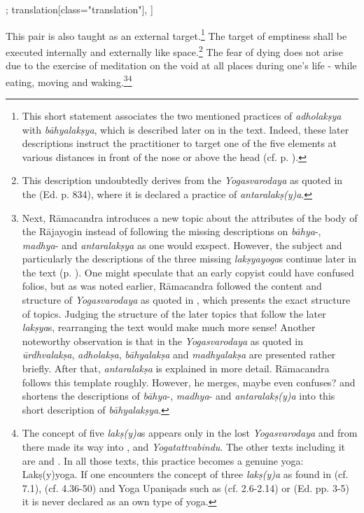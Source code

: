 \begin{alignment}[
  texts=edition[class="edition"];
  translation[class="translation"],
  ]
\begin{translation}
\begin{tlate}
    This pair is also taught as an external target.\footnote{This short statement associates the two mentioned practices of \textit{adholakṣya} with \textit{bāhyalakṣya}, which is described later on in the text. Indeed, these later descriptions instruct the practitioner to target one of the five elements at various distances in front of the nose or above the head (cf. p. \pageref{bahya2}).} The target of emptiness shall be executed internally and externally like space.\footnote{This description undoubtedly derives from the \textit{Yogasvarodaya} as quoted in the  (Ed. p. 834), where it is declared a practice of \textit{antaralakṣ(y)a}.} The fear of dying does not arise due to the exercise of meditation on the void at all places during one's life - while eating, moving and waking.\footnote{Next, Rāmacandra introduces a new topic about the attributes of the body of the Rājayogin instead of following the missing descriptions on \textit{bāhya}-, \textit{madhya}- and \textit{antaralakṣya} as one would exspect. However, the subject and particularly the descriptions of the three missing \textit{lakṣyayoga}s continue later in the text (p. \pageref{bahya2}). One might speculate that an early copyist could have confused folios, but as was noted earlier, Rāmacandra followed the content and structure of \textit{Yogasvarodaya} as quoted in , which presents the exact structure of topics. Judging the structure of the later topics that follow the later \textit{lakṣya}s, rearranging the text would make much more sense! Another noteworthy observation is that in the \textit{Yogasvarodaya} as quoted in  \textit{ūrdhvalakṣa}, \textit{adholakṣa}, \textit{bāhyalakṣa} and \textit{madhyalakṣa} are presented rather briefly. After that, \textit{antaralakṣa} is explained in more detail. Rāmacandra follows this template roughly. However, he merges, maybe even confuses? and shortens the descriptions of \textit{bāhya}-, \textit{madhya}- and \textit{antaralakṣ(y)a} into this short description of \textit{bāhyalakṣya}.}\footnote{The concept of five \textit{lakṣ(y)a}s appears only in the lost \textit{Yogasvarodaya} and from there made its way into ,  and \textit{Yogatattvabindu}. The other texts including it are  and . In all those texts, this practice becomes a genuine yoga: Lakṣ(y)yoga. If one encounters the concept of three \textit{lakṣ(y)a} as found in  (cf. 7.1),  (cf. 4.36-50) and Yoga Upaniṣads such as (cf. 2.6-2.14) or  (Ed. pp. 3-5) it is never declared as an own type of yoga.} \vspace*{\fill}
    \end{tlate}
  \end{translation}
  \ekdpb*{}
\end{alignment}
